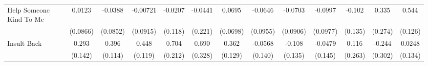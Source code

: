 {\begin{tabular}{l*{12}{c}}
\addlinespace
Help Someone Kind To Me&      0.0123         &     -0.0388         &    -0.00721         &     -0.0207         &     -0.0441         &      0.0695         &     -0.0646         &     -0.0703         &     -0.0997         &      -0.102         &       0.335         &       0.544\sym{***}\\
            &    (0.0866)         &    (0.0852)         &    (0.0915)         &     (0.118)         &     (0.221)         &    (0.0698)         &    (0.0955)         &    (0.0906)         &    (0.0977)         &     (0.135)         &     (0.274)         &     (0.126)         \\
\addlinespace
Insult Back &       0.293\sym{*}  &       0.396\sym{***}&       0.448\sym{***}&       0.704\sym{***}&       0.690\sym{*}  &       0.362\sym{**} &     -0.0568         &      -0.108         &     -0.0479         &       0.116         &      -0.244         &      0.0248         \\
            &     (0.142)         &     (0.114)         &     (0.119)         &     (0.212)         &     (0.328)         &     (0.129)         &     (0.140)         &     (0.135)         &     (0.145)         &     (0.263)         &     (0.302)         &     (0.134)         \\
\bottomrule
\end{tabular}
}
